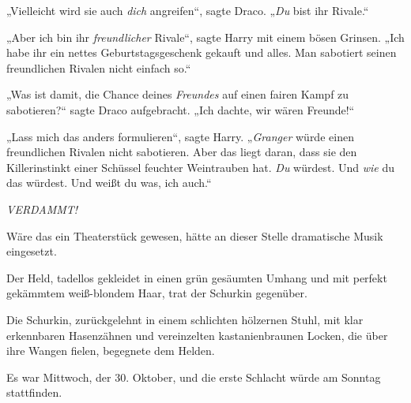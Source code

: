 „Vielleicht wird sie auch \emph{dich} angreifen“, sagte Draco.
„\emph{Du} bist ihr Rivale.“

„Aber ich bin ihr \emph{freundlicher} Rivale“, sagte Harry mit einem bösen Grinsen.
„Ich habe ihr ein nettes Geburtstagsgeschenk gekauft und alles. Man sabotiert seinen freundlichen Rivalen nicht einfach so.“

„Was ist damit, die Chance deines \emph{Freundes} auf einen fairen Kampf zu sabotieren?“ sagte Draco aufgebracht.
„Ich dachte, wir wären Freunde!“

„Lass mich das anders formulieren“, sagte Harry.
„\emph{Granger} würde einen freundlichen Rivalen nicht sabotieren. Aber das liegt daran, dass sie den Killerinstinkt einer Schüssel feuchter Weintrauben hat. \emph{Du} würdest. Und \emph{wie} du das würdest. Und weißt du was, ich auch.“

\emph{VERDAMMT!}

\later

Wäre das ein Theaterstück gewesen, hätte an dieser Stelle dramatische Musik eingesetzt.

Der Held, tadellos gekleidet in einen grün gesäumten Umhang und mit perfekt gekämmtem weiß-blondem Haar, trat der Schurkin gegenüber.

Die Schurkin, zurückgelehnt in einem schlichten hölzernen Stuhl, mit klar erkennbaren Hasenzähnen und vereinzelten kastanienbraunen Locken, die über ihre Wangen fielen, begegnete dem Helden.

Es war Mittwoch, der 30. Oktober, und die erste Schlacht würde am Sonntag stattfinden.

